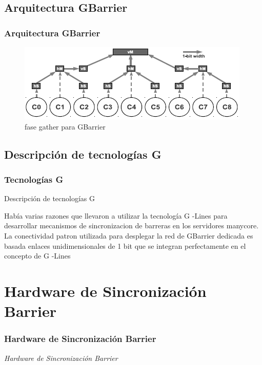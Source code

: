 \documentclass[11pt]{beamer}					%
\begin{document}
			\subsection{Arquitectura GBarrier}			
			\begin{frame}[fragile]
		\frametitle{Arquitectura GBarrier}
			
	\begin{figure}[ht] %
	\centering
		\includegraphics[scale=1]{imagenes/GBarrier.png}   %
	\caption{fase gather para GBarrier} \label{fig:fase gather para GBarrier}
\end{figure}
				
	
			\end{frame}			
			
			
			
			
			   		\subsection{Descripción de tecnologías G}			
			\begin{frame}[fragile]
		\frametitle{Tecnologías G}
			
			\begin{block}{Descripción de tecnologías G}
			
			
	Había varias razones que llevaron a utilizar la tecnología
G -Lines para desarrollar mecanismos de sincronizacion de
barreras en los servidores manycore. \\
La
conectividad patron utilizada para desplegar la red de GBarrier
dedicada es basada enlaces unidimensionales de 1 bit que
se integran perfectamente en el concepto de G -Lines

				\end{block}
				
				
	
			\end{frame}
			\section{Hardware de Sincronización Barrier}	
		 \begin{frame}[fragile]
			\frametitle{Hardware de Sincronización Barrier}
			\begin{huge}
			\begin{center}
				\emph{\textit{Hardware de Sincronización Barrier}}
			\end{center}
			\end{huge}
		\end{frame}		
\end{document}
